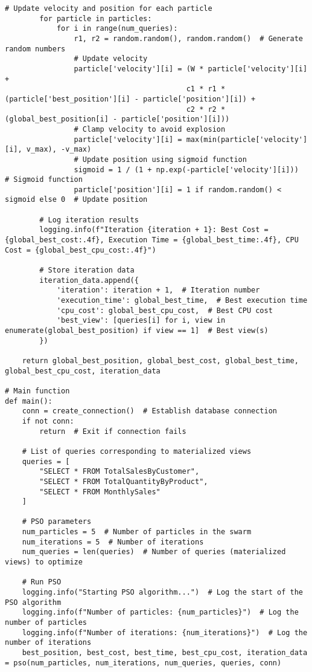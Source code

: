 \begin{lstlisting}[style=pythonstyle, caption={Python script to automate optimal view.}, label={lst:fullCode}]
        # Update velocity and position for each particle
        for particle in particles:
            for i in range(num_queries):
                r1, r2 = random.random(), random.random()  # Generate random numbers
                # Update velocity
                particle['velocity'][i] = (W * particle['velocity'][i] +
                                          c1 * r1 * (particle['best_position'][i] - particle['position'][i]) +
                                          c2 * r2 * (global_best_position[i] - particle['position'][i]))
                # Clamp velocity to avoid explosion
                particle['velocity'][i] = max(min(particle['velocity'][i], v_max), -v_max)
                # Update position using sigmoid function
                sigmoid = 1 / (1 + np.exp(-particle['velocity'][i]))  # Sigmoid function
                particle['position'][i] = 1 if random.random() < sigmoid else 0  # Update position

        # Log iteration results
        logging.info(f"Iteration {iteration + 1}: Best Cost = {global_best_cost:.4f}, Execution Time = {global_best_time:.4f}, CPU Cost = {global_best_cpu_cost:.4f}")

        # Store iteration data
        iteration_data.append({
            'iteration': iteration + 1,  # Iteration number
            'execution_time': global_best_time,  # Best execution time
            'cpu_cost': global_best_cpu_cost,  # Best CPU cost
            'best_view': [queries[i] for i, view in enumerate(global_best_position) if view == 1]  # Best view(s)
        })

    return global_best_position, global_best_cost, global_best_time, global_best_cpu_cost, iteration_data

# Main function
def main():
    conn = create_connection()  # Establish database connection
    if not conn:
        return  # Exit if connection fails

    # List of queries corresponding to materialized views
    queries = [
        "SELECT * FROM TotalSalesByCustomer",
        "SELECT * FROM TotalQuantityByProduct",
        "SELECT * FROM MonthlySales"
    ]

    # PSO parameters
    num_particles = 5  # Number of particles in the swarm
    num_iterations = 5  # Number of iterations
    num_queries = len(queries)  # Number of queries (materialized views) to optimize

    # Run PSO
    logging.info("Starting PSO algorithm...")  # Log the start of the PSO algorithm
    logging.info(f"Number of particles: {num_particles}")  # Log the number of particles
    logging.info(f"Number of iterations: {num_iterations}")  # Log the number of iterations
    best_position, best_cost, best_time, best_cpu_cost, iteration_data = pso(num_particles, num_iterations, num_queries, queries, conn)


\end{lstlisting}
